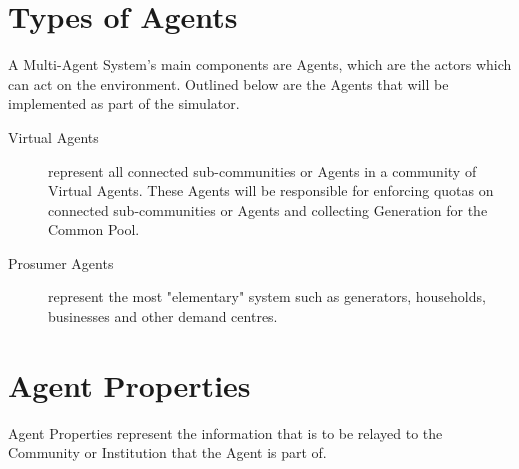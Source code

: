 \section*{Types of Agents}
A Multi-Agent System's main components are Agents, which are the actors which can act on the environment. Outlined below are the Agents that will be implemented as part of the simulator.
\begin{description}
\item[Virtual Agents]
represent all connected sub-communities or Agents in a community of Virtual Agents. These Agents will be responsible for enforcing quotas on connected sub-communities or Agents and collecting Generation for the Common Pool. 

\item[Prosumer Agents]
represent the most "elementary" system such as generators, households, businesses and other demand centres.
\end{description}

\section*{Agent Properties}
Agent Properties represent the information that is to be relayed to the Community or Institution that the Agent is part of.


